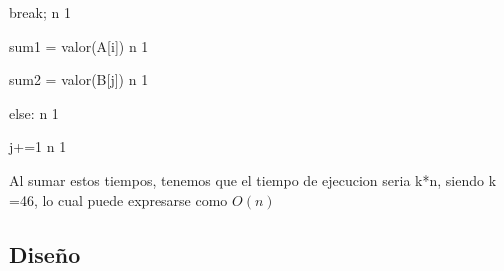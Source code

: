 \documentclass{article}
\begin{document}
                        break;                                      n    1
        
                    sum1 = valor(A[i])                              n    1
        
                    sum2 = valor(B[j])                              n    1


        
            else:                                                   n    1
        
                j+=1                                                n    1


Al sumar estos tiempos, tenemos que el tiempo de ejecucion seria k*n, siendo k =46, lo cual puede expresarse como $O(n)$

\subsection{Diseño}
\end{document}
